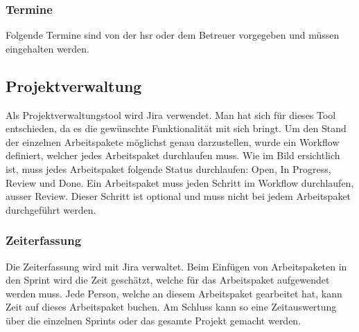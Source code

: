 \subsubsection*{Termine}
Folgende Termine sind von der \gls{hsr} oder dem Betreuer vorgegeben und müssen eingehalten werden.


\subsection{Projektverwaltung}
Als Projektverwaltungstool wird Jira verwendet. Man hat sich für dieses Tool entschieden, da es die gewünschte Funktionalität mit sich bringt. Um den Stand der einzelnen Arbeitspakete möglichst genau darzustellen, wurde ein Workflow definiert, welcher jedes Arbeitspaket durchlaufen muss.
Wie im Bild ersichtlich ist, muss jedes Arbeitspaket folgende Status durchlaufen: Open, In Progress, Review und Done. Ein Arbeitspaket muss jeden Schritt im Workflow durchlaufen, ausser Review. Dieser Schritt ist optional und muss nicht bei jedem Arbeitspaket durchgeführt werden.

\subsubsection*{Zeiterfassung}
Die Zeiterfassung wird mit Jira verwaltet. Beim Einfügen von Arbeitspaketen in den Sprint wird die Zeit geschätzt, welche für das Arbeitspaket aufgewendet werden muss. Jede Person, welche an diesem Arbeitspaket gearbeitet hat, kann Zeit auf dieses Arbeitspaket buchen. Am Schluss kann so eine Zeitauswertung über die einzelnen Sprints oder das gesamte Projekt gemacht werden.

